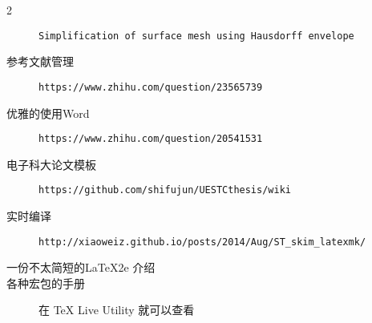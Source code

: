 \begin{description}
    \item[2] \texttt{Simplification of surface mesh using Hausdorff envelope}
    \item[参考文献管理] \texttt{https://www.zhihu.com/question/23565739}
    \item[优雅的使用Word] \texttt{https://www.zhihu.com/question/20541531}
    \item[电子科大论文模板] \texttt{https://github.com/shifujun/UESTCthesis/wiki}
    \item[实时编译] \texttt{http://xiaoweiz.github.io/posts/2014/Aug/ST\_skim\_latexmk/}
    \item[一份不太简短的\LaTeX2e 介绍]   
    \item[各种宏包的手册] 在 TeX Live Utility 就可以查看
\end{description}
